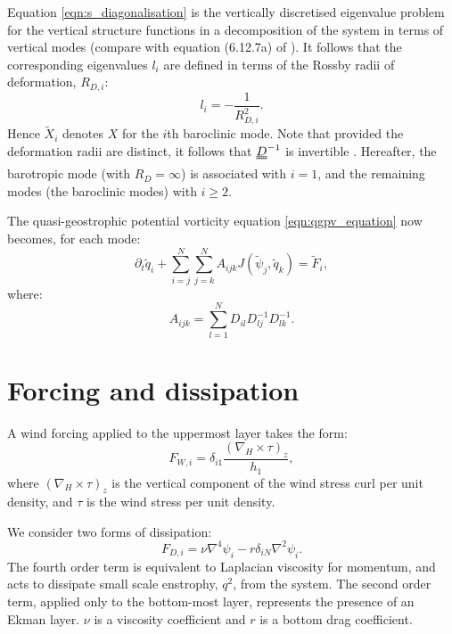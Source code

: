 \documentclass[a4paper]{book}
\begin{document}
Equation \eqref{eqn:s_diagonalisation} is the vertically
discretised eigenvalue problem for the vertical structure functions in
a decomposition of the system in terms of vertical modes (compare with equation
(6.12.7a) of \citet{pedlosky1987}). It follows that
the corresponding eigenvalues $l_i$ are defined in terms of the Rossby
radii of deformation, $R_{D,i}$:
\begin{equation}
  l_i = -\frac{1}{R_{D,i}^2}.
\end{equation}
Hence $\tilde{X}_i$ denotes $X$ for the $i$th baroclinic mode. Note that provided
the deformation radii are distinct, it follows that $\uuline{D}^{-1}$ is
invertible \citep{strang1988}. Hereafter, the barotropic mode (with $R_D = \infty$)
is associated with $i = 1$, and the remaining modes (the baroclinic modes)
with $i \geq 2$.

The quasi-geostrophic potential vorticity equation \eqref{eqn:qgpv_equation}
now becomes, for each mode:
\begin{equation}\label{eqn:qgpv_equation_modal}
  \partial_t \tilde{q}_i + \sum_{i = j}^N \sum_{j = k}^N A_{ijk} J \left( \tilde{\psi}_j, \tilde{q}_k \right) = \tilde{F}_i,
\end{equation}
where:
\begin{equation}
  A_{ijk} = \sum_{l = 1}^N D_{il} D^{-1}_{lj} D^{-1}_{lk}.
\end{equation}

\section{Forcing and dissipation}\label{sect:qgpv_forcing}

A wind forcing applied to the uppermost layer takes the form:
\begin{equation}
  F_{W,i} = \delta_{i1} \frac{\left( \nabla_H \times \tau \right)_z}{h_1},
\end{equation}
where $\left( \nabla_H \times \tau \right)_z$ is the vertical component of the
wind stress curl per unit density, and $\tau$ is the wind stress per unit
density.

We consider two forms of dissipation:
\begin{equation}
  F_{D,i} = \nu \nabla^4 \psi_i - r \delta_{iN} \nabla^2 \psi_i.
\end{equation}
The fourth order term is equivalent to Laplacian viscosity for momentum, and
acts to dissipate small scale enstrophy, $q^2$, from the system. The second order
term, applied only to the bottom-most layer, represents the presence of an Ekman layer.
$\nu$ is a viscosity coefficient and $r$ is a bottom drag coefficient.
\end{document}
